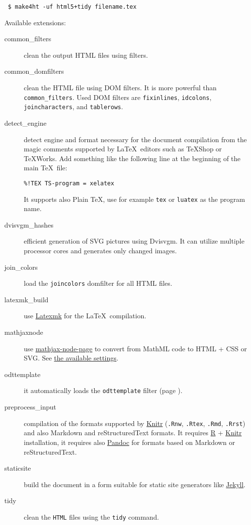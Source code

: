 \begin{verbatim}
 $ make4ht -uf html5+tidy filename.tex
\end{verbatim}

Available extensions:

\begin{description}
\item[common\_filters]
clean the output HTML files using filters.
\item[common\_domfilters]
clean the HTML file using DOM filters. It is more powerful than
\texttt{common\_filters}. Used DOM filters are \texttt{fixinlines},
\texttt{idcolons}, \texttt{joincharacters}, and \texttt{tablerows}.
\item[detect\_engine]
detect engine and format necessary for the document compilation from the
magic comments supported by \LaTeX~editors such as TeXShop or TeXWorks.
Add something like the following line at the beginning of the main
\TeX~file:

\texttt{\%!TEX\ TS-program\ =\ xelatex}

It supports also Plain \TeX, use for example \texttt{tex} or
\texttt{luatex} as the program name.
\item[dvisvgm\_hashes]
efficient generation of SVG pictures using Dvisvgm. It can utilize
multiple processor cores and generates only changed images.
\item[join\_colors]
load the \texttt{joincolors} domfilter for all HTML files.
\item[latexmk\_build]
use \href{https://ctan.org/pkg/latexmk?lang=en}{Latexmk} for the
\LaTeX~compilation.
\item[mathjaxnode]
use \href{https://github.com/pkra/mathjax-node-page/}{mathjax-node-page}
to convert from MathML code to HTML + CSS or SVG. See
\protect\hyperlink{mathjaxsettings}{the available settings}.
\item[odttemplate]
it automatically loads the \texttt{odttemplate} filter (page
\pageref{sec:odttemplate}).
\item[preprocess\_input]
compilation of the formats supported by
\href{https://yihui.name/knitr/}{Knitr} (\texttt{.Rnw}, \texttt{.Rtex},
\texttt{.Rmd}, \texttt{.Rrst}) and also Markdown and reStructuredText
formats. It requires \href{https://www.r-project.org/}{R} +
\href{https://yihui.name/knitr/}{Knitr} installation, it requires also
\href{https://pandoc.org/}{Pandoc} for formats based on Markdown or
reStructuredText.
\item[staticsite]
build the document in a form suitable for static site generators like
\href{https://jekyllrb.com/}{Jekyll}.
\item[tidy]
clean the \texttt{HTML} files using the \texttt{tidy} command.
\end{description}

